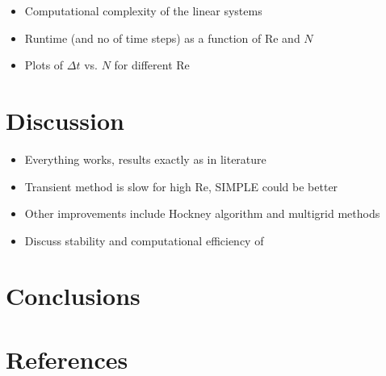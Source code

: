 \documentclass[final,3p,twocolumn]{elsarticle}
\begin{document}
\begin{itemize}
    \item Computational complexity of the linear systems
    \item Runtime (and no of time steps) as a function of Re and $N$
    \item Plots of $\Delta t$ vs. $N$ for different Re 
\end{itemize}

\section{Discussion}
\label{sec:discussion}

\begin{itemize}
    \item Everything works, results exactly as in literature
    \item Transient method is slow for high Re, SIMPLE could be better
    \item Other improvements include Hockney algorithm and multigrid methods
    \item Discuss stability and computational efficiency of
\end{itemize}

\section{Conclusions}
\label{sec:conclusion}


\section*{References}


\end{document}
